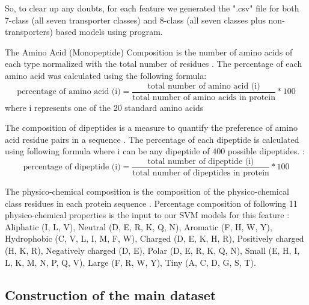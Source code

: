     So, to clear up any doubts, for each feature we generated the ".csv" file for both 7-class (all seven transporter classes) and 8-class 
    (all seven classes plus non-transporters) based models using  program.
    
    
    The Amino Acid (Monopeptide) Composition is the number of amino acids of each type normalized with the total number of 
    residues \cite{gromiha2010protein}. The percentage of each amino acid was calculated using the following formula:
    \begin{equation}
        \text{percentage of amino acid (i)} = \frac {\text{total number of amino acid (i)}} {\text{total number of amino acids in protein}} * 100
    \end{equation}
    where i represents one of the 20 standard amino acids \cite{mishra2014prediction} 
    
    The composition of dipeptides is a measure to quantify the preference of amino acid residue pairs in a sequence 
    \cite{gromiha2010protein}. The percentage of each dipeptide is calculated using following formula where i 
    can be any dipeptide of 400 possible dipeptides. \cite{mishra2014prediction}:
    \begin{equation}
        \text{percentage of dipeptide (i)} = \frac {\text{total number of dipeptide (i)}} {\text{total number of dipeptides in protein}} * 100
    \end{equation}

    
    The physico-chemical composition is the composition of the physico-chemical class residues in each protein sequence 
    \cite{mishra2014prediction}. Percentage composition of following 11 physico-chemical properties is the input to our 
    SVM models for this feature \cite{mishra2014prediction, kumar2008copid}:\\
    
    Aliphatic (I, L, V), Neutral (D, E, R, K, Q, N), Aromatic (F, H, W, Y),
    Hydrophobic (C, V, L, I, M, F, W), Charged (D, E, K, H, R), Positively charged (H, K, R), 
    Negatively charged (D, E), Polar (D, E, R, K, Q, N),
    Small (E, H, I, L, K, M, N, P, Q, V), Large (F, R, W, Y), Tiny (A, C, D, G, S, T).

    \subsection{Construction of the main dataset}

